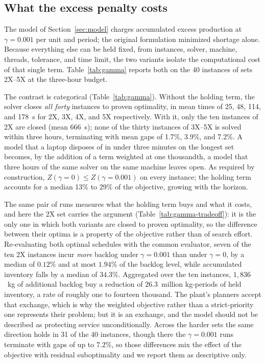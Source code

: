 \subsection{What the excess penalty costs}
\label{sec:gamma}

The model of Section~\ref{sec:model} charges accumulated excess
production at $\gamma=0.001$ per unit and period; the original
formulation minimized shortage alone. Because everything else can be
held fixed, from instances, solver, machine, threads, tolerance, and
time limit, the two variants isolate the computational cost of that
single term. Table~\ref{tab:gamma} reports both on the 40
instances of sets 2X--5X at the three-hour budget.




The contrast is categorical (Table~\ref{tab:gamma}). Without the
holding term, the solver closes \emph{all forty} instances to proven
optimality, in mean times of 25, 48, 114, and 178~s for 2X, 3X, 4X,
and 5X respectively. With it, only the ten instances of 2X are closed
(mean 666~s); none of the thirty instances of 3X--5X is solved within
three hours, terminating with mean gaps of 1.7\%, 3.9\%, and 7.2\%.
A model that a laptop disposes of in under three minutes on the
longest set becomes, by the addition of a term weighted at one
thousandth, a model that three hours of the same solver on the same
machine leaves open. As required by construction,
$Z(\gamma=0)\le Z(\gamma=0.001)$ on every instance; the holding term
accounts for a median 13\% to 29\% of the objective, growing with the
horizon.

The same pair of runs measures what the holding term buys and what it
costs, and here the 2X set carries the argument
(Table~\ref{tab:gamma-tradeoff}): it is the only one in which both
variants are closed to proven optimality, so the difference between
their optima is a property of the objective rather than of search
effort. Re-evaluating both optimal schedules with the common evaluator,
seven of the ten 2X instances incur \emph{more} backlog under
$\gamma=0.001$ than under $\gamma=0$, by a median of $0.12\%$ and at
most $1.94\%$ of the backlog level, while accumulated inventory falls
by a median of $34.3\%$. Aggregated over the ten instances,
$1{,}836$~kg of additional backlog buy a reduction of $26.3$~million
kg-periods of held inventory, a rate of roughly one to fourteen
thousand. The plant's planners accept that exchange, which is why the
weighted objective rather than a strict-priority one represents their
problem; but it is an exchange, and the model should not be described
as protecting service unconditionally. Across the harder sets the same
direction holds in 31 of the 40 instances, though there the
$\gamma=0.001$ runs terminate with gaps of up to $7.2\%$, so those
differences mix the effect of the objective with residual
suboptimality and we report them as descriptive only.

